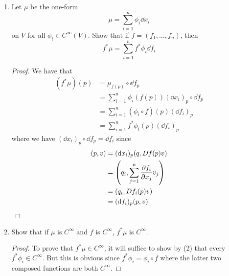 \documentclass[../psets.tex]{subfiles}
\begin{document}
\begin{enumerate}[label={\textbf{2.2.\roman*.}}]
\begin{enumerate}
        \begin{proof}
            We have that
            \begin{align*}
                (f^*\dd\phi)(p) &= \dd\phi_{f(p)}\circ\dd f_p\\
                &= \dd(\phi\circ f)_p\\
                &= \dd f^*\phi
            \end{align*}
            where $f^*\phi=\phi\circ f$ is another variation of the pullback.
        \end{proof}
        \item Let $\mu$ be the one-form
        \begin{equation*}
            \mu = \sum_{i=1}^n\phi_i\dd{x_i}
        \end{equation*}
        on $V$ for all $\phi_i\in C^\infty(V)$. Show that if $f=(f_1,\dots,f_n)$, then
        \begin{equation*}
            f^*\mu = \sum_{i=1}^nf^*\phi_i\dd{f_i}
        \end{equation*}
        \begin{proof}
            We have that
            \begin{align*}
                (f^*\mu)(p) &= \mu_{f(p)}\circ\dd f_p\\
                &= \sum_{i=1}^n\phi_i(f(p))(\dd{x_i})_p\circ\dd f_p\\
                &= \sum_{i=1}^n(\phi_i\circ f)(p)(\dd{f_i})_p\\
                &= \sum_{i=1}^nf^*\phi_i(p)(\dd{f_i})_p
            \end{align*}
            where we have $(\dd{x_i})_p\circ\dd f_p=\dd{f_i}$ since
            \begin{align*}
                [(\dd{x_i})_p\circ\dd f_p](p,v) &= (\dd{x_i})_p(q,Df(p)v)\\
                &= \left( q_i,\sum_{j=1}^n\pdv{f_i}{x_j}v_j \right)\\
                &= (q_i,Df_i(p)v)\\
                &= (\dd{f_i})_p(p,v)
            \end{align*}
        \end{proof}
        \item Show that if $\mu$ is $C^\infty$ and $f$ is $C^\infty$, $f^*\mu$ is $C^\infty$.
        \begin{proof}
            To prove that $f^*\mu\in C^\infty$, it will suffice to show by (2) that every $f^*\phi_i\in C^\infty$. But this is obvious since $f^*\phi_i=\phi_i\circ f$ where the latter two composed functions are both $C^\infty$.

\end{proof}
\end{enumerate}
\end{enumerate}
\end{document}
